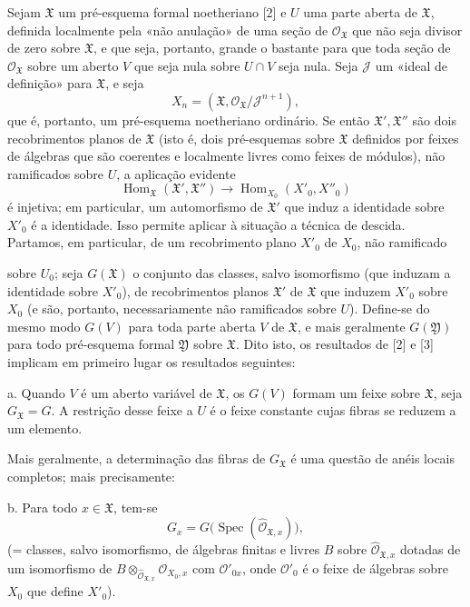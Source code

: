 \documentclass[11pt,twoside,openany]{book}
\numberwithin{equation}{section}
\newcommand{\src}[1]{%
  \phantomsection\hypertarget{src:#1}{}%
  \marginpar{\raggedleft\footnotesize\sffamily #1}%
}
\theoremstyle{plain}
\theoremstyle{definition}
\theoremstyle{remark}
\newcommand{\FgaUnitKey}{frontmatter}
\renewcommand{\src}[1]{%
  \phantomsection\hypertarget{src:\FgaUnitKey:#1}{}%
  \marginpar{\raggedleft\footnotesize\sffamily #1}%
}
\begin{document}
Sejam $\mathfrak X$ um pré-esquema formal noetheriano [2] e $U$ uma parte
aberta de $\mathfrak X$, definida localmente pela «não anulação» de uma
seção de $\mathcal O_{\mathfrak X}$ que não seja divisor de zero sobre
$\mathfrak X$, e que seja, portanto, grande o bastante para que toda seção
de $\mathcal O_{\mathfrak X}$ sobre um aberto $V$ que seja nula sobre $U\cap V$
seja nula. Seja $\mathcal J$ um «ideal de definição» para $\mathfrak X$, e seja
\[
  X_n=(\mathfrak X,\mathcal O_{\mathfrak X}/\mathcal J^{n+1}),
\]
que é, portanto, um pré-esquema noetheriano ordinário. Se então
$\mathfrak X',\mathfrak X''$ são dois recobrimentos planos de $\mathfrak X$ (isto
é, dois pré-esquemas sobre $\mathfrak X$ definidos por feixes de álgebras que
são coerentes e localmente livres como feixes de módulos), não ramificados sobre
$U$, a aplicação evidente
\[
  \operatorname{Hom}_{\mathfrak X}(\mathfrak X',\mathfrak X'')
  \longrightarrow
  \operatorname{Hom}_{X_0}(X'_0,X''_0)
\]
é injetiva; em particular, um automorfismo de $\mathfrak X'$ que induz a
identidade sobre $X'_0$ é a identidade. Isso permite aplicar à situação a
técnica de descida. Partamos, em particular, de um recobrimento plano $X'_0$
de $X_0$, não ramificado

\src{388}
sobre $U_0$; seja $G(\mathfrak X)$ o conjunto das classes, salvo isomorfismo
(que induzam a identidade sobre $X'_0$), de recobrimentos planos $\mathfrak X'$
de $\mathfrak X$ que induzem $X'_0$ sobre $X_0$ (e são, portanto,
necessariamente não ramificados sobre $U$). Define-se do mesmo modo $G(V)$ para
toda parte aberta $V$ de $\mathfrak X$, e mais geralmente $G(\mathfrak Y)$
para todo pré-esquema formal $\mathfrak Y$ sobre $\mathfrak X$. Dito isto, os
resultados de [2] e [3] implicam em primeiro lugar os resultados seguintes:

\noindent a. Quando $V$ é um aberto variável de $\mathfrak X$, os $G(V)$
formam um feixe sobre $\mathfrak X$, seja $G_{\mathfrak X}=G$. A restrição desse
feixe a $U$ é o feixe constante cujas fibras se reduzem a um elemento.

Mais geralmente, a determinação das fibras de $G_{\mathfrak X}$ é uma
questão de anéis locais completos; mais precisamente:

\noindent b. Para todo $x\in\mathfrak X$, tem-se
\[
  G_x=G\bigl(\operatorname{Spec}(\widehat{\mathcal O}_{\mathfrak X,x})\bigr),
\]
(= classes, salvo isomorfismo, de álgebras finitas e livres $B$ sobre
$\widehat{\mathcal O}_{\mathfrak X,x}$ dotadas de um isomorfismo de
$B\otimes_{\widehat{\mathcal O}_{\mathfrak X,x}}\mathcal O_{X_0,x}$ com
$\mathcal O'_{0x}$, onde $\mathcal O'_0$ é o feixe de álgebras sobre
$X_0$ que define $X'_0$).
\end{document}
